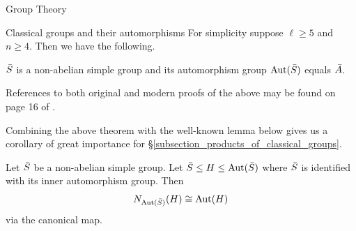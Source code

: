 \documentclass[11pt,a4paper]{article}
\begin{document}
\begin{section}{Group Theory}
\begin{subsection}{Classical groups and their automorphisms}
For simplicity suppose $\ell\geq 5$ and $n \geq 4$. Then we have the following.
\begin{theorem}{\cite[Theorems 2.1.3 and 2.1.4]{KleidmanLiebeck}}
$\Bar{S}$ is a non-abelian simple group and its automorphism group $\Aut(\Bar{S})$ equals $\Bar{A}$.
\end{theorem}
References to both original and modern proofs of the above may be found on page 16 of \cite{KleidmanLiebeck}.

Combining the above theorem with the well-known lemma below gives us a corollary of great importance for \S \ref{subsection_products_of_classical_groups}.

\begin{lemma}
Let $\Bar{S}$ be a non-abelian simple group. Let $\Bar{S}\leq H \leq \Aut(\Bar{S})$ where $\Bar{S}$ is identified with its inner automorphism group. Then
\[N_{\Aut(\Bar{S})}(H) \cong \Aut(H)\]
via the canonical map.
\end{lemma}






\end{subsection}
\end{section}
\end{document}
